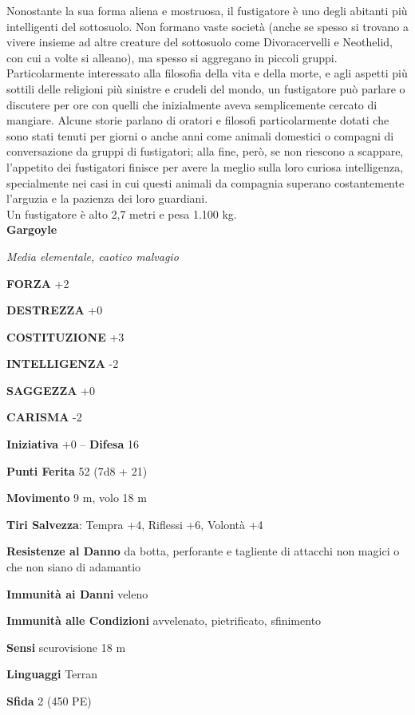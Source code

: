 \begin{multicols}{2}
Nonostante la sua forma aliena e mostruosa, il fustigatore è uno degli abitanti più intelligenti del sottosuolo. Non formano vaste società (anche se spesso si trovano a vivere insieme ad altre creature del sottosuolo come Divoracervelli e Neothelid, con cui a volte si alleano), ma spesso si aggregano in piccoli gruppi. Particolarmente interessato alla filosofia della vita e della morte, e agli aspetti più sottili delle religioni più sinistre e crudeli del mondo, un fustigatore può parlare o discutere per ore con quelli che inizialmente aveva semplicemente cercato di mangiare. Alcune storie parlano di oratori e filosofi particolarmente dotati che sono stati tenuti per giorni o anche anni come animali domestici o compagni di conversazione da gruppi di fustigatori; alla fine, però, se non riescono a scappare, l'appetito dei fustigatori finisce per avere la meglio sulla loro curiosa intelligenza, specialmente nei casi in cui questi animali da compagnia superano costantemente l'arguzia e la pazienza dei loro guardiani.\\
Un fustigatore è alto 2,7 metri e pesa 1.100 kg.\\


\medskip{}\textbf{Gargoyle}

\emph{Media elementale, caotico malvagio}

\textbf{FORZA} +2

\textbf{DESTREZZA} +0

\textbf{COSTITUZIONE} +3

\textbf{INTELLIGENZA} -2

\textbf{SAGGEZZA} +0

\textbf{CARISMA} -2

\textbf{Iniziativa} +0 -- \textbf{Difesa} 16

\textbf{Punti Ferita} 52 (7d8 + 21)

\textbf{Movimento} 9 m, volo 18 m

\textbf{Tiri Salvezza}: Tempra +4, Riflessi +6, Volontà +4

\textbf{Resistenze al Danno} da botta, perforante e tagliente di attacchi non magici o che non siano di adamantio

\textbf{Immunità ai Danni} veleno

\textbf{Immunità alle Condizioni} avvelenato, pietrificato, sfinimento

\textbf{Sensi} scurovisione 18 m

\textbf{Linguaggi} Terran

\textbf{Sfida} 2 (450 PE)


\end{multicols}
